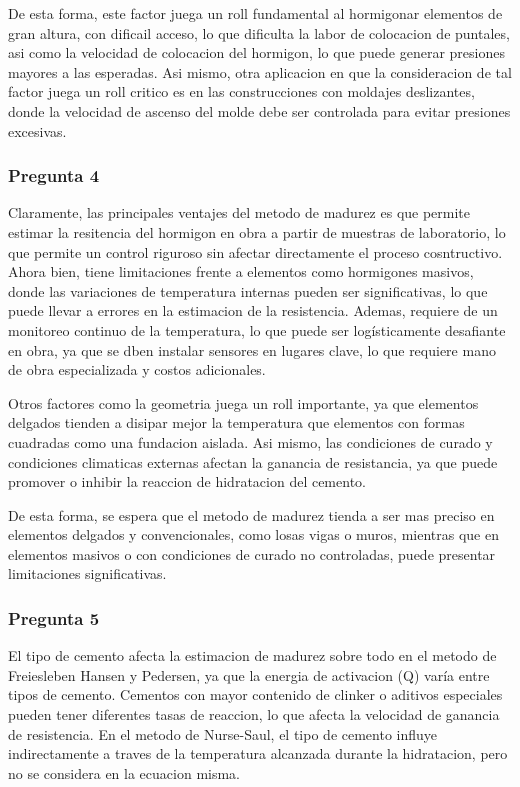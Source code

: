 De esta forma, este factor juega un roll fundamental al hormigonar elementos de gran altura, con dificail acceso, lo que dificulta la labor de colocacion de puntales, asi como la velocidad de colocacion del hormigon, lo que puede generar presiones mayores a las esperadas. Asi mismo, otra aplicacion en que la consideracion de tal factor juega un roll critico es en las construcciones con moldajes deslizantes, donde la velocidad de ascenso del molde debe ser controlada para evitar presiones excesivas.

\subsubsection*{Pregunta 4} 

Claramente, las principales ventajes del metodo de madurez es que permite estimar la resitencia del hormigon en obra a partir de muestras de laboratorio, lo que permite un control riguroso sin afectar directamente el proceso cosntructivo. Ahora bien, tiene limitaciones frente a elementos como hormigones masivos, donde las variaciones de temperatura internas pueden ser significativas, lo que puede llevar a errores en la estimacion de la resistencia. Ademas, requiere de un monitoreo continuo de la temperatura, lo que puede ser logísticamente desafiante en obra, ya que se dben instalar sensores en lugares clave, lo que requiere mano de obra especializada y costos adicionales.

Otros factores como la geometria juega un roll importante, ya que elementos delgados tienden a disipar mejor la temperatura que elementos con formas cuadradas como una fundacion aislada. Asi mismo, las condiciones de curado y condiciones climaticas externas afectan la ganancia de resistancia, ya que puede promover o inhibir la reaccion de hidratacion del cemento.

De esta forma, se espera que el metodo de madurez tienda a ser mas preciso en elementos delgados y convencionales, como losas vigas o muros, mientras que en elementos masivos o con condiciones de curado no controladas, puede presentar limitaciones significativas.

\subsubsection*{Pregunta 5} 

El tipo de cemento afecta la estimacion de madurez sobre todo en el metodo de Freiesleben Hansen y Pedersen, ya que la energia de activacion (Q) varía entre tipos de cemento. Cementos con mayor contenido de clinker o aditivos especiales pueden tener diferentes tasas de reaccion, lo que afecta la velocidad de ganancia de resistencia. En el metodo de Nurse-Saul, el tipo de cemento influye indirectamente a traves de la temperatura alcanzada durante la hidratacion, pero no se considera en la ecuacion misma.

